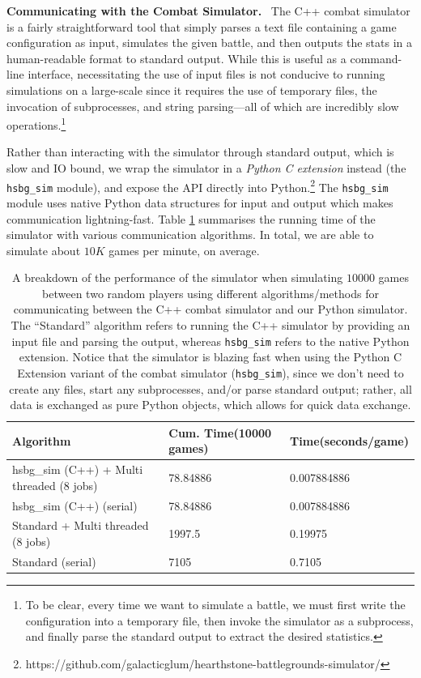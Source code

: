 \documentclass{paper}
\newcommand{\inlineSection}[1]{\vspace{0.5em}\noindent\textbf{#1.}~}
\begin{document}
\inlineSection{Communicating with the Combat Simulator} The C++ combat simulator is a fairly straightforward tool that simply parses a text file containing a game configuration as input, simulates the given battle, and then outputs the stats in a human-readable format to standard output. While this is useful as a command-line interface, necessitating the use of input files is not conducive to running simulations on a large-scale since it requires the use of temporary files, the invocation of subprocesses, and string parsing---all of which are incredibly slow operations.\footnote{To be clear, every time we want to simulate a battle, we must first write the configuration into a temporary file, then invoke the simulator as a subprocess, and finally parse the standard output to extract the desired statistics.}

Rather than interacting with the simulator through standard output, which is slow and IO bound, we wrap the simulator in a \textit{Python C extension} instead (the \texttt{hsbg\_sim} module), and expose the API directly into Python.\footnote{https://github.com/galacticglum/hearthstone-battlegrounds-simulator/} The \texttt{hsbg\_sim} module uses native Python data structures for input and output which makes communication lightning-fast. Table \ref{tab:c++_sim_speed_summary} summarises the running time of the simulator with various communication algorithms. In total, we are able to simulate about $10K$ games per minute, on average.

\begin{table}[h]
    \centering
    \begin{tabularx}{0.5\textwidth}{@{}XXX@{}}\toprule
        \textbf{Algorithm} & \textbf{Cum. Time\newline (10000 games)} & \textbf{Time\newline (seconds/game)}\\\midrule
    
        hsbg\_sim (C++) + Multi threaded (8 jobs) & 78.84886 & 0.007884886 \\\hdashline
       hsbg\_sim (C++) (serial) & 78.84886 & 0.007884886 \\\hdashline
       Standard + Multi threaded (8 jobs) & 1997.5 & 0.19975 \\\hdashline
       Standard (serial) & 7105 & 0.7105 \\\bottomrule
    \end{tabularx}
    \caption{A breakdown of the performance of the simulator when simulating $10000$ games between two random players using different algorithms/methods for communicating between the C++ combat simulator and our Python simulator. The ``Standard'' algorithm refers to running the C++ simulator by providing an input file and parsing the output, whereas \texttt{hsbg\_sim} refers to the native Python extension. Notice that the simulator is blazing fast when using the Python C Extension variant of the combat simulator (\texttt{hsbg\_sim}), since we don't need to create any files, start any subprocesses, and/or parse standard output; rather, all data is exchanged as pure Python objects, which allows for quick data exchange.}
    \label{tab:c++_sim_speed_summary}
\end{table}
\end{document}
